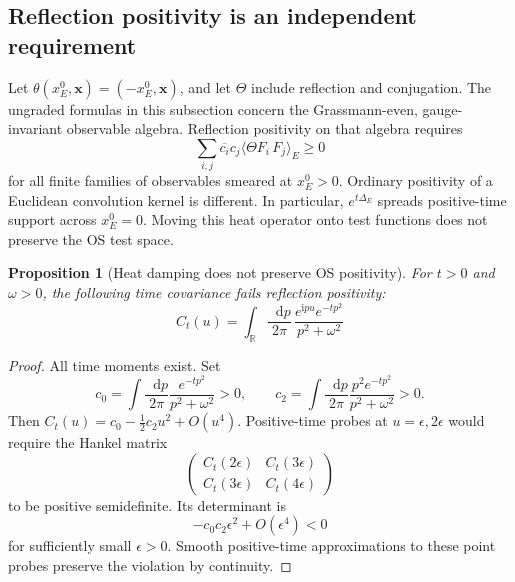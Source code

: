 \documentclass[final,5p,times,twocolumn,numbers,nopreprintline]{elsarticle}
\numberwithin{equation}{section}
\newtheorem{proposition}[theorem]{Proposition}
\theoremstyle{definition}
\theoremstyle{remark}
\newcommand{\dd}{\mathop{}\!\mathrm d}
\newcommand{\ii}{\mathrm i}
\newcommand{\RR}{\mathbb R}
\begin{document}
\subsection{Reflection positivity is an independent requirement}
\label{sec:OS}

Let \(\theta(x_E^0,\mathbf x)=(-x_E^0,\mathbf x)\), and let
\(\Theta\) include reflection and conjugation. The ungraded formulas
in this subsection concern the Grassmann-even, gauge-invariant
observable algebra. Reflection positivity on that algebra requires
\begin{equation}
 \sum_{i,j}\overline{c_i}c_j
    \langle\Theta F_i\,F_j\rangle_E\geq0
 \label{eq:OS}
\end{equation}
for all finite families of observables smeared at
\(x_E^0>0\). Ordinary positivity of a Euclidean convolution
kernel is different. In particular, \(e^{t\Delta_E}\) spreads
positive-time support across \(x_E^0=0\). Moving this heat
operator onto test functions does not preserve the OS test space.

\begin{proposition}[Heat damping does not preserve OS positivity]
\label{prop:OS-counterexample}
For \(t>0\) and \(\omega>0\), the following time covariance
fails reflection positivity:
\begin{equation}
 C_t(u)=\int_{\RR}\frac{\dd p}{2\pi}\,
       \frac{e^{\ii pu}e^{-tp^2}}{p^2+\omega^2}
 \label{eq:heat-time-covariance}
\end{equation}
\end{proposition}

\begin{proof}
All time moments exist. Set
\[
 c_0=\int\frac{\dd p}{2\pi}
           \frac{e^{-tp^2}}{p^2+\omega^2}>0,\qquad
 c_2=\int\frac{\dd p}{2\pi}
           \frac{p^2e^{-tp^2}}{p^2+\omega^2}>0 .
\]
Then \(C_t(u)=c_0-\tfrac12c_2u^2+O(u^4)\).
Positive-time probes at \(u=\epsilon,2\epsilon\) would require
the Hankel matrix
\[
 \begin{pmatrix}
 C_t(2\epsilon)&C_t(3\epsilon)\\
 C_t(3\epsilon)&C_t(4\epsilon)
 \end{pmatrix}
\]
to be positive semidefinite. Its determinant is
\begin{equation}
 -c_0c_2\epsilon^2+O(\epsilon^4)<0
 \label{eq:OS-negative-determinant}
\end{equation}
for sufficiently small \(\epsilon>0\).
Smooth positive-time approximations to these point probes preserve
the violation by continuity.
\end{proof}
\end{document}
